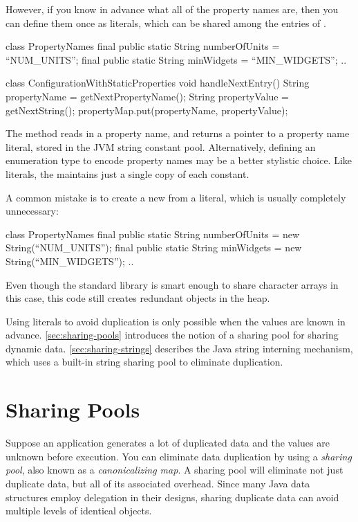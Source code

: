 However, if you know in advance what all of the property names are, then you can
define them once as  literals, which can be shared among the
entries of .
\begin{shortlisting}
class PropertyNames {
	final public static String numberOfUnits = ``NUM_UNITS'';
	final public static String minWidgets = ``MIN_WIDGETS'';
	..
}

class ConfigurationWithStaticProperties {
    void handleNextEntry() {
       String propertyName = getNextPropertyName(); 
       String propertyValue = getNextString();
       propertyMap.put(propertyName, propertyValue);
    }
}
\end{shortlisting}
The  method reads in a property name, and returns
a pointer to a property name literal, stored in the JVM string
constant pool. Alternatively, defining an enumeration
type to encode property names may be a better stylistic choice.  Like
 literals, the \jre maintains just a single copy of each
 constant.

A common
 mistake is to create a new   from a  literal,
 which is usually completely unnecessary:
\begin{shortlisting}
class PropertyNames {
	final public static String numberOfUnits = 
	                           new String(``NUM_UNITS'');
	final public static String minWidgets = 
	                           new String(``MIN_WIDGETS'');
	..
}
\end{shortlisting}
Even though the standard library is smart enough to share
character arrays in this case, this code still creates redundant 
objects in the heap.

Using  literals to avoid duplication is only possible when the
 values are known in advance. 
\autoref{sec:sharing-pools} introduces the notion of a sharing pool for
sharing dynamic data. \autoref{sec:sharing-strings} describes the Java
string interning mechanism, which uses a built-in string sharing pool to
eliminate duplication.

\section{Sharing Pools}
\label{sec:sharing-pools}

Suppose an application generates a lot of duplicated data and the values
are unknown before execution. 
You can eliminate data duplication by using a \emph{sharing pool}, also known
as a \emph{canonicalizing map}. 
A sharing pool will eliminate not just duplicate data, 
but all of its associated overhead. Since many Java data structures employ 
delegation in their designs, sharing duplicate data can avoid
multiple levels of identical objects.

